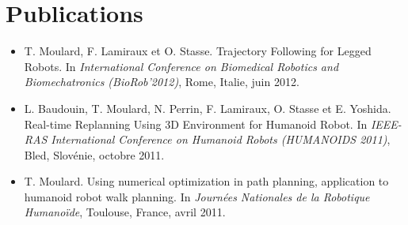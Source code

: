 \chapter*{Publications}
\label{chap:publis}

\begin{itemize}
\item T. Moulard, F. Lamiraux et O. Stasse. Trajectory Following for
  Legged Robots. In \emph{International Conference on Biomedical
    Robotics and Biomechatronics (BioRob'2012)}, Rome, Italie, juin
  2012.
\item L. Baudouin, T. Moulard, N. Perrin, F. Lamiraux, O. Stasse et
  E. Yoshida. Real-time Replanning Using 3D Environment for Humanoid
  Robot. In \emph{IEEE-RAS International Conference on Humanoid Robots
    (HUMANOIDS 2011)}, Bled, Slovénie, octobre 2011.
\item T. Moulard. Using numerical optimization in path planning,
  application to humanoid robot walk planning. In \emph{Journées
    Nationales de la Robotique Humanoïde}, Toulouse, France, avril
  2011.
\end{itemize}
